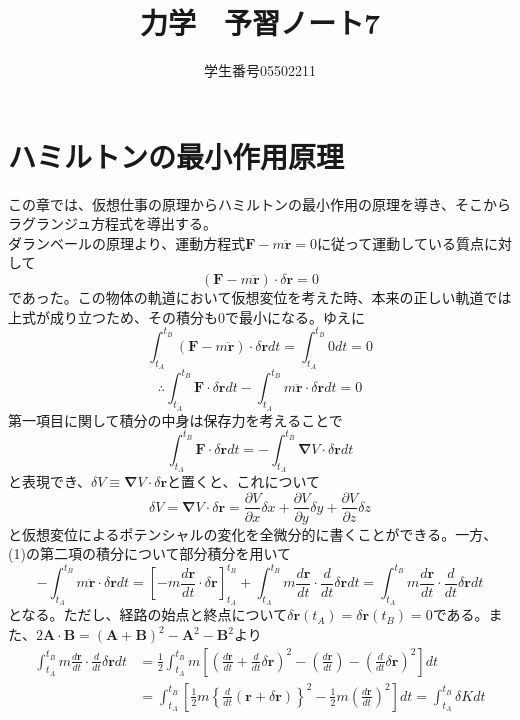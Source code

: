 \documentclass{jsarticle}
\title{力学　予習ノート7}
\author{学生番号05502211}
\date{}
\begin{document}
\maketitle
\section{ハミルトンの最小作用原理}
\noindent
この章では、仮想仕事の原理からハミルトンの最小作用の原理を導き、そこからラグランジュ方程式を導出する。\\
ダランベールの原理より、運動方程式\(\bm{F}-m\ddot{\bm{r}}=0\)に従って運動している質点に対して
\[(\bm{F}-m\ddot{\bm{r}})\cdot\delta\bm{r}=0\]
であった。この物体の軌道において仮想変位を考えた時、本来の正しい軌道では上式が成り立つため、その積分も0で最小になる。ゆえに
\[\int_{t_{A}}^{t_{B}}(\bm{F}-m\ddot{\bm{r}})\cdot\delta\bm{r}dt=\int_{t_{A}}^{t_{B}}0dt=0\]
\begin{equation}
\therefore\int_{t_{A}}^{t_{B}}\bm{F}\cdot\delta\bm{r}dt-\int_{t_{A}}^{t_{B}}m\ddot{\bm{r}}\cdot\delta\bm{r}dt=0
\end{equation}
第一項目に関して積分の中身は保存力を考えることで
\[\int_{t_{A}}^{t_{B}}\bm{F}\cdot\delta\bm{r}dt=-\int_{t_{A}}^{t_{B}}\bm{\nabla}V\cdot\delta\bm{r}dt\]
と表現でき、\(\delta V\equiv\bm{\nabla}V\cdot\delta\bm{r}\)と置くと、これについて
\[\delta V=\bm{\nabla}V\cdot\delta\bm{r}=\frac{\partial V}{\partial x}\delta x+\frac{\partial V}{\partial y}\delta y+\frac{\partial V}{\partial z}\delta z\]
と仮想変位によるポテンシャルの変化を全微分的に書くことができる。一方、(1)の第二項の積分について部分積分を用いて
\[-\int_{t_{A}}^{t_{B}}m\ddot{\bm{r}}\cdot\delta\bm{r}dt=\left[-m\frac{d\bm{r}}{dt}\cdot\delta\bm{r}\right]_{t_{A}}^{t_{B}}+\int_{t_{A}}^{t_{B}}m\frac{d\bm{r}}{dt}\cdot\frac{d}{dt}\delta\bm{r}dt=\int_{t_{A}}^{t_{B}}m\frac{d\bm{r}}{dt}\cdot\frac{d}{dt}\delta\bm{r}dt\]
となる。ただし、経路の始点と終点について\(\delta\bm{r}(t_{A})=\delta\bm{r}(t_{B})=0\)である。また、\(2\bm{A}\cdot\bm{B}=(\bm{A}+\bm{B})^{2}-\bm{A}^{2}-\bm{B}^{2}\)より
\begin{align*}
\int_{t_{A}}^{t_{B}}m\frac{d\bm{r}}{dt}\cdot\frac{d}{dt}\delta\bm{r}dt&=\frac{1}{2}\int_{t_{A}}^{t_{B}}m\left[\left(\frac{d\bm{r}}{dt}+\frac{d}{dt}\delta\bm{r}\right)^{2}-\left(\frac{d\bm{r}}{dt}\right)-\left(\frac{d}{dt}\delta\bm{r}\right)^{2}\right]dt\\
&=\int_{t_{A}}^{t_{B}}\left[\frac{1}{2}m\left\{\frac{d}{dt}(\bm{r}+\delta\bm{r})\right\}^{2}-\frac{1}{2}m\left(\frac{d\bm{r}}{dt}\right)^{2}\right]dt=\int_{t_{A}}^{t_{B}}\delta Kdt
\end{align*}
\end{document}
